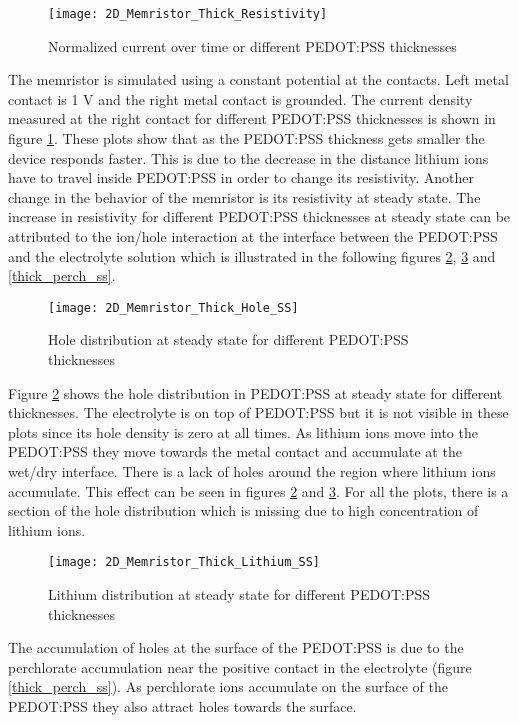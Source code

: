 \begin{doublespace}
\begin{figure}[!htp]
\centering
\texttt{[image: 2D\_Memristor\_Thick\_Resistivity]}
\caption{Normalized current over time or different PEDOT:PSS thicknesses} 
\label{thick_resistivity}
\end{figure}

The memristor is simulated using a constant potential at the contacts. Left metal contact is 1 V and the right metal contact is grounded. The current density measured at the right contact for different PEDOT:PSS thicknesses is shown in figure \ref{thick_resistivity}. These plots show that as the PEDOT:PSS thickness gets smaller the device responds faster. This is due to the decrease in the distance lithium ions have to travel inside PEDOT:PSS in order to change its resistivity. Another change in the behavior of the memristor is its resistivity at steady state. The increase in resistivity for different PEDOT:PSS thicknesses at steady state can be attributed to the ion/hole interaction at the interface between the PEDOT:PSS and the electrolyte solution which is illustrated in the following figures \ref{thick_p_ss}, \ref{thick_li_ss} and \ref{thick_perch_ss}.

\begin{figure}[!htp]
\centering
\texttt{[image: 2D\_Memristor\_Thick\_Hole\_SS]}
\caption{Hole distribution at steady state for different PEDOT:PSS thicknesses} 
\label{thick_p_ss}
\end{figure}

Figure \ref{thick_p_ss} shows the hole distribution in PEDOT:PSS at steady state for different thicknesses. The electrolyte is on top of PEDOT:PSS but it is not visible in these plots since its hole density is zero at all times. As lithium ions move into the PEDOT:PSS they move towards the metal contact and accumulate at the wet/dry interface. There is a lack of holes around the region where lithium ions accumulate. This effect can be seen in figures \ref{thick_p_ss} and  \ref{thick_li_ss}. For all the plots, there is a section of the hole distribution which is missing due to high concentration of lithium ions.

\begin{figure}[!htp]
\centering
\texttt{[image: 2D\_Memristor\_Thick\_Lithium\_SS]}
\caption{Lithium distribution at steady state for different PEDOT:PSS thicknesses} 
\label{thick_li_ss}
\end{figure}

The accumulation of holes at the surface of the PEDOT:PSS is due to the perchlorate accumulation near the positive contact in the electrolyte (figure \ref{thick_perch_ss}). As perchlorate ions accumulate on the surface of the PEDOT:PSS they also attract holes towards the surface.


\end{doublespace}
